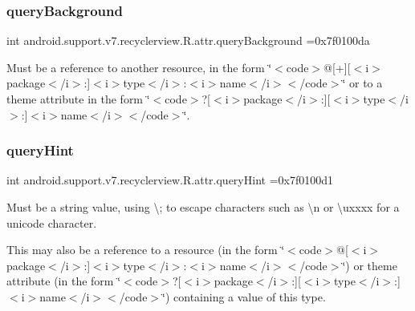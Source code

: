 \subsubsection{\texorpdfstring{query\+Background}{queryBackground}}
{\footnotesize\ttfamily int android.\+support.\+v7.\+recyclerview.\+R.\+attr.\+query\+Background =0x7f0100da\hspace{0.3cm}{\ttfamily [static]}}

Must be a reference to another resource, in the form \char`\"{}$<$code$>$@\mbox{[}+\mbox{]}\mbox{[}$<$i$>$package$<$/i$>$\+:\mbox{]}$<$i$>$type$<$/i$>$\+:$<$i$>$name$<$/i$>$$<$/code$>$\char`\"{} or to a theme attribute in the form \char`\"{}$<$code$>$?\mbox{[}$<$i$>$package$<$/i$>$\+:\mbox{]}\mbox{[}$<$i$>$type$<$/i$>$\+:\mbox{]}$<$i$>$name$<$/i$>$$<$/code$>$\char`\"{}. \mbox{\label{classandroid_1_1support_1_1v7_1_1recyclerview_1_1R_1_1attr_a5e6cb9aa9d166d0c1982413872b0da40}} 
\subsubsection{\texorpdfstring{query\+Hint}{queryHint}}
{\footnotesize\ttfamily int android.\+support.\+v7.\+recyclerview.\+R.\+attr.\+query\+Hint =0x7f0100d1\hspace{0.3cm}{\ttfamily [static]}}

Must be a string value, using \textquotesingle{}\textbackslash{};\textquotesingle{} to escape characters such as \textquotesingle{}\textbackslash{}n\textquotesingle{} or \textquotesingle{}\textbackslash{}uxxxx\textquotesingle{} for a unicode character. 

This may also be a reference to a resource (in the form \char`\"{}$<$code$>$@\mbox{[}$<$i$>$package$<$/i$>$\+:\mbox{]}$<$i$>$type$<$/i$>$\+:$<$i$>$name$<$/i$>$$<$/code$>$\char`\"{}) or theme attribute (in the form \char`\"{}$<$code$>$?\mbox{[}$<$i$>$package$<$/i$>$\+:\mbox{]}\mbox{[}$<$i$>$type$<$/i$>$\+:\mbox{]}$<$i$>$name$<$/i$>$$<$/code$>$\char`\"{}) containing a value of this type. \mbox{\label{classandroid_1_1support_1_1v7_1_1recyclerview_1_1R_1_1attr_aecfbbcc95a1f33726ae6ac719b18580e}} 
